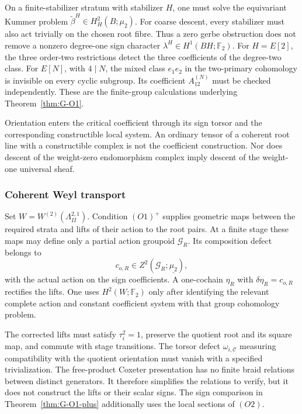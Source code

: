 On a finite-stabilizer stratum with stabilizer \(H\), one must
solve the equivariant Kummer problem
\(\widetilde\beta^H\in H^2_H(B;\mu_2)\).
For coarse descent, every stabilizer must also act trivially on the
chosen root fibre. Thus a zero gerbe obstruction does not remove a
nonzero degree-one sign character
\(\lambda^H\in H^1(BH;\mathbb F_2)\).
For \(H=E[2]\), the three order-two restrictions detect the three
coefficients of the degree-two class. For \(E[N]\), with
\(4\mid N\), the mixed class \(e_1e_2\) in the two-primary
cohomology is invisible on every cyclic subgroup. Its coefficient
\(A_{12}^{(N)}\) must be checked independently. These are the
finite-group calculations underlying Theorem~\ref{thm:G-O1}.

Orientation enters the critical coefficient through its sign
torsor and the corresponding constructible local system. An
ordinary tensor of a coherent root line with a constructible complex
is not the coefficient construction. Nor does descent of the
weight-zero endomorphism complex imply descent of the weight-one
universal sheaf.

\subsubsection*{Coherent Weyl transport}

Set \(W=W^{(2)}(\Lambda_{II}^{2,1})\).
Condition \((O1)^+\) supplies geometric maps between the required
strata and lifts of their action to the root pairs. At a finite stage
these maps may define only a partial action groupoid
\(\mathcal G_R\). Its composition defect belongs to
\[
 c_{o,R}\in Z^2(\mathcal G_R;\underline{\mu_2}),
\]
with the actual action on the sign coefficients. A one-cochain
\(\eta_R\) with \(\delta\eta_R=c_{o,R}\) rectifies the lifts.
One uses \(H^2(W;\mathbb F_2)\) only after identifying the relevant
complete action and constant coefficient system with that group
cohomology problem.

The corrected lifts must satisfy \(\tau_i^2=1\), preserve the
quotient root and its square map, and commute with stage
transitions. The torsor defect \(\omega_{i,\mathcal C}\) measuring
compatibility with the quotient orientation must vanish with a
specified trivialization. The free-product Coxeter presentation has
no finite braid relations between distinct generators. It therefore
simplifies the relations to verify, but it does not construct the
lifts or their scalar signs. The sign comparison in
Theorem~\ref{thm:G-O1-plus} additionally uses the local sections of
\((O2)\).

